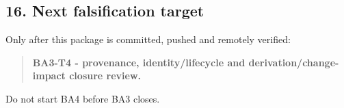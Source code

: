 \documentclass[11pt,a4paper]{article}
\begin{document}
\subsection{16. Next falsification
target}\label{next-falsification-target}

Only after this package is committed, pushed and remotely verified:

\begin{quote}
\textbf{BA3-T4 - provenance, identity/lifecycle and
derivation/change-impact closure review.}
\end{quote}

Do not start BA4 before BA3 closes.
\end{document}
